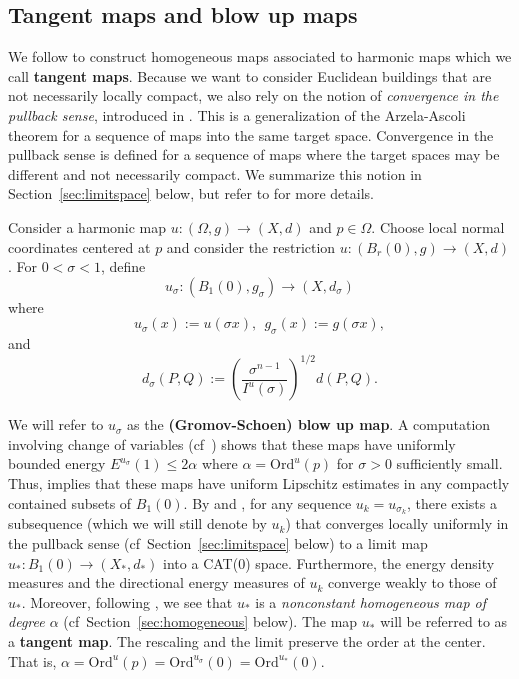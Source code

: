 \documentclass[12pt]{amsart}
\theoremstyle{definition}
\numberwithin{equation}{section}
\newcommand{\B}{B}
\begin{document}
\subsection{Tangent maps and blow up maps} \label{subsec:rescaling}
\label{ss:pullback}
We follow  \cite[Section 3]{gromov-schoen} to construct   homogeneous  maps associated to harmonic maps which we call {\bf tangent maps}.  Because we want to consider Euclidean buildings that are not necessarily locally compact, we also rely on the notion of {\it convergence in the pullback sense},  introduced in \cite{korevaar-schoen2}.    This is a generalization of the Arzela-Ascoli theorem for a sequence of maps  into the same target space.  Convergence in the pullback sense is defined for a sequence of maps where the target spaces  may be different and not necessarily compact.  {We summarize this notion in Section~\ref{sec:limitspace} below, but refer to  \cite[Section 3]{korevaar-schoen2} for more details.}



Consider a harmonic map $u:(\Omega,g) \to (X,d)$  and $p \in \Omega$. Choose local normal coordinates centered at $p$ and consider the restriction $u:(\B_r(0),g) \to (X,d)$. 
For $0<\sigma<1$, define
\begin{equation}\label{eq:usigmamap}
u_\sigma:(B_1(0),g_\sigma) \to (X, d_\sigma)
\end{equation}
where
\[
u_\sigma(x) := u\left(\sigma x\right), \ \  
g_\sigma(x) :=g\left(\sigma x\right),
\]
and
\[
d_\sigma(P,Q):=\left(\frac{\sigma^{n-1}}{I^u(\sigma)}\right)^{1/2}d(P,Q).
\]

 We will refer to $u_\sigma$ as the {\bf (Gromov-Schoen) blow up map}.  A computation involving  change of variables (cf~\cite[Section 3]{gromov-schoen}) shows that these maps have uniformly bounded  energy $E^{u_\sigma}(1) \leq 2\alpha$ where $\alpha =\text{Ord}^u(p)$ for $\sigma>0$ sufficiently small.  Thus, \cite[Theorem 2.4.6]{korevaar-schoen1} implies that these maps have uniform Lipschitz estimates in any compactly contained subsets of $B_1(0)$.  By \cite[Proposition 3.7]{korevaar-schoen2} and \cite[Theorem 3.11]{korevaar-schoen2}, for any sequence  $u_k=u_{\sigma_k}$, there exists a subsequence (which we will still denote by $u_k$) that converges locally uniformly in the pullback sense (cf~Section~\ref{sec:limitspace} below) to a limit  map $u_*:B_1(0) \rightarrow (X_*,d_*)$ into a CAT(0) space. 
 Furthermore, the energy density measures and the directional energy measures of $u_k$ converge weakly to those of $u_*$.  Moreover, following  \cite[last paragraph in the proof of Proposition 3.3]{gromov-schoen}, we see that $u_*$ is a {\it nonconstant homogeneous map of degree $\alpha$} (cf~Section~\ref{sec:homogeneous} below). The map  $u_*$ will be  referred to as a {\bf tangent map}.
The rescaling and the limit  preserve the order at the center. That is, $\alpha=\text{Ord}^u(p)=\text{Ord}^{u_\sigma}(0)= \text{Ord}^{u_*}(0)$.
\end{document}
